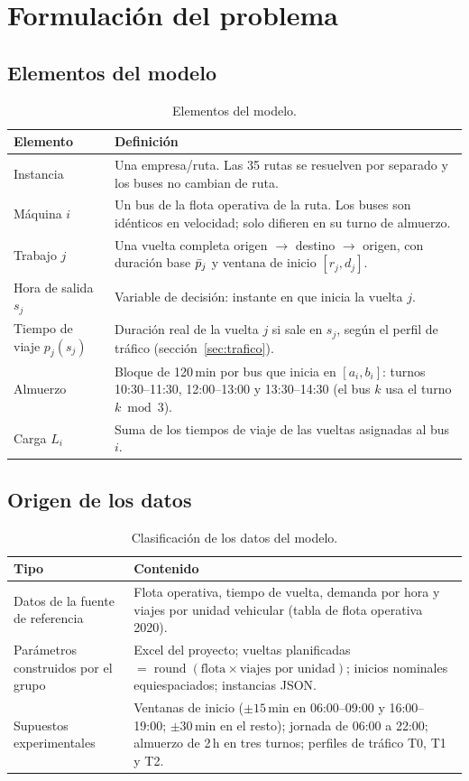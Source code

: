 \section{Formulación del problema}\label{sec:formulacion}

\subsection{Elementos del modelo}
\begin{table}[H]
\centering\small
\caption{Elementos del modelo.}
\begin{tabularx}{\textwidth}{L{3.6cm}Y}
\toprule
Elemento & Definición \\
\midrule
Instancia & Una empresa/ruta. Las 35 rutas se resuelven por separado y los buses no cambian de ruta. \\
Máquina $i$ & Un bus de la flota operativa de la ruta. Los buses son idénticos en velocidad; solo difieren en su turno de almuerzo. \\
Trabajo $j$ & Una vuelta completa origen $\to$ destino $\to$ origen, con duración base $\bar{p}_j$ y ventana de inicio $[r_j, d_j]$. \\
Hora de salida $s_j$ & Variable de decisión: instante en que inicia la vuelta $j$. \\
Tiempo de viaje $p_j(s_j)$ & Duración real de la vuelta $j$ si sale en $s_j$, según el perfil de tráfico (sección~\ref{sec:trafico}). \\
Almuerzo & Bloque de 120\,min por bus que inicia en $[a_i, b_i]$: turnos 10:30--11:30, 12:00--13:00 y 13:30--14:30 (el bus $k$ usa el turno $k \bmod 3$). \\
Carga $L_i$ & Suma de los tiempos de viaje de las vueltas asignadas al bus $i$. \\
\bottomrule
\end{tabularx}
\end{table}

\subsection{Origen de los datos}
\begin{table}[H]
\centering\small
\caption{Clasificación de los datos del modelo.}
\begin{tabularx}{\textwidth}{L{4.2cm}Y}
\toprule
Tipo & Contenido \\
\midrule
Datos de la fuente de referencia & Flota operativa, tiempo de vuelta, demanda por hora y viajes por unidad vehicular (tabla de flota operativa 2020). \\
Parámetros construidos por el grupo & Excel del proyecto; vueltas planificadas $=\operatorname{round}(\text{flota} \times \text{viajes por unidad})$; inicios nominales equiespaciados; instancias JSON. \\
Supuestos experimentales & Ventanas de inicio ($\pm15$\,min en 06:00--09:00 y 16:00--19:00; $\pm30$\,min en el resto); jornada de 06:00 a 22:00; almuerzo de 2\,h en tres turnos; perfiles de tráfico T0, T1 y T2. \\
\bottomrule
\end{tabularx}
\end{table}

